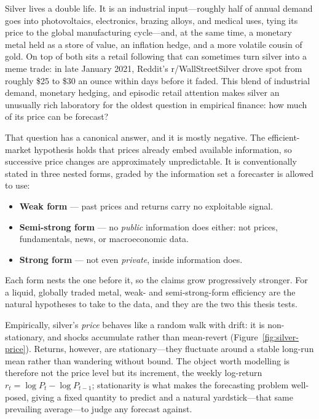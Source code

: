 \documentclass[12pt, a4paper]{article}
\begin{document}
Silver lives a double life. It is an industrial input---roughly half of annual demand
goes into photovoltaics, electronics, brazing alloys, and medical uses, tying its price
to the global manufacturing cycle---and, at the same time, a monetary metal held as a
store of value, an inflation hedge, and a more volatile cousin of gold. On top of both
sits a retail following that can sometimes turn silver into a meme trade: in late January
2021, Reddit's r/WallStreetSilver drove spot from roughly \$25 to \$30 an ounce within
days before it faded. This blend of industrial demand, monetary hedging, and episodic
retail attention makes silver an unusually rich laboratory for the oldest question in
empirical finance: how much of its price can be forecast?

That question has a canonical answer, and it is mostly negative. The efficient-market
hypothesis \parencite{fama1970,fama1991} holds that prices already embed available
information, so successive price changes are approximately unpredictable. It is conventionally stated in three nested forms, graded by the
information set a forecaster is allowed to use:

\begin{itemize}
    \item \textbf{Weak form} --- past prices and returns carry no exploitable signal.
    \item \textbf{Semi-strong form} --- no \emph{public} information does either: not
    prices, fundamentals, news, or macroeconomic data.
    \item \textbf{Strong form} --- not even \emph{private}, inside information does.
\end{itemize}

\noindent Each form nests the one before it, so the claims grow progressively stronger.
For a liquid, globally traded metal, weak- and semi-strong-form efficiency are the
natural hypotheses to take to the data, and they are the two this thesis tests.

Empirically, silver's \emph{price} behaves like a random walk with drift: it is
non-stationary, and shocks accumulate rather than mean-revert
(Figure~\ref{fig:silver-price}). Returns, however, are stationary---they fluctuate around
a stable long-run mean rather than wandering without bound. The object worth modelling is
therefore not the price level but its increment, the weekly log-return
\(r_t = \log P_t - \log P_{t-1}\); stationarity is what makes the forecasting problem
well-posed, giving a fixed quantity to predict and a natural yardstick---that same
prevailing average---to judge any forecast against.
\end{document}
